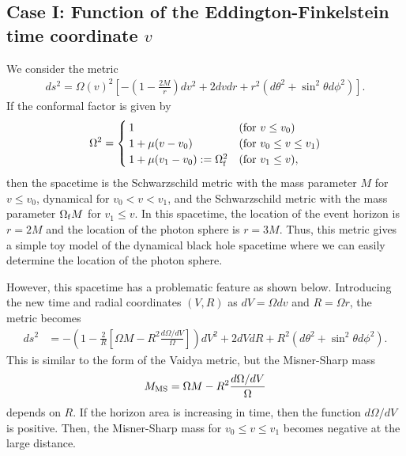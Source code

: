 \documentclass[prd,showpacs,preprintnumbers,groupedaddress,superscriptaddress,nofootinbib,11pt]{revtex4-1} %
\theoremstyle{newplain}
\begin{document}
\subsection{Case I: Function of the Eddington-Finkelstein time coordinate $v$}
We consider the metric
\begin{align}
ds^2 = \Omega(v)^2\left[
-\left(1 - \frac{2M}{r}\right)dv^2 + 2 dvdr + r^2 (d\theta^2 + \sin^2\theta d\phi^2)
\right].
\end{align}
If the conformal factor is given by
\begin{align}
\Omega^2 = 
\begin{cases}
  1 &({\rm for}~v \le v_0)
\\ 
  1 + \mu (v - v_0) &({\rm for}~v_0 \le v \le v_1)
\\ 
  1 + \mu (v_1 - v_0) := \Omega_{\rm f}^2 & ({\rm for}~v_1 \le v),
\end{cases}
\end{align}
then the spacetime is the Schwarzschild metric with the mass parameter $M$ for $v \le v_0$,
dynamical for $v_0 < v < v_1$, 
and 
the Schwarzschild metric with the mass parameter $\Omega_{\rm f}M$ for $v_1 \le v$.
In this spacetime, the location of the event horizon is $r = 2 M$
and the location of the photon sphere is $ r = 3M$.
Thus, this metric gives a simple toy model of the dynamical black hole spacetime where
we can easily determine the location of the photon sphere.

However, this spacetime has a problematic feature as shown below.
Introducing the new time and radial coordinates $(V,R)$ as $dV = \Omega dv$ and $R = \Omega r$,
the metric becomes
\begin{align}
ds^2 
&= -\left(1 - \frac{2}{R}\left[\Omega M - R^2 \frac{d\Omega /dV}{\Omega }\right]\right)dV^2 + 2dVdR + R^2(d\theta^2 + \sin^2\theta d\phi^2).
\end{align}
This is similar to the form of the Vaidya metric, but 
the Misner-Sharp mass 
\begin{align}
M_{\rm MS} =\Omega M - R^2 \frac{d\Omega /dV}{\Omega }
\end{align}
depends on $R$.
If the horizon area is increasing in time, then the function $d\Omega/dV$ is positive.
Then, the Misner-Sharp mass for $v_0 \le v \le v_1$ becomes negative at the large distance.
\end{document}
